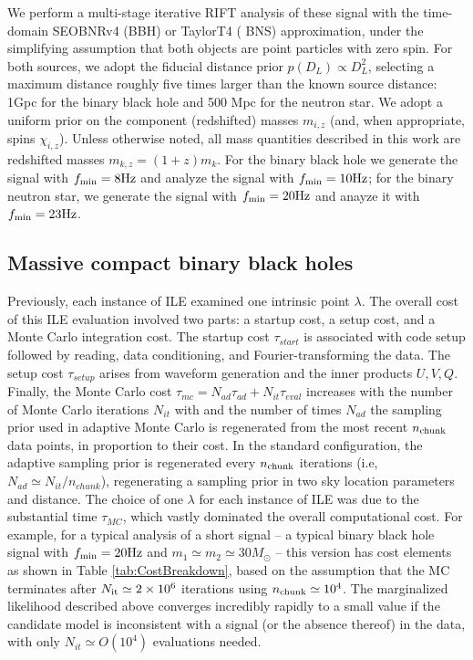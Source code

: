 \documentclass[twocolumn,prd,nofootinbib]{revtex4}
\newcommand\unit[1]{{\rm #1}}
\begin{document}
 We perform a multi-stage iterative RIFT analysis of these signal with the
time-domain SEOBNRv4 (BBH) or TaylorT4 \cite{gw-astro-PN-Comparison-AlessandraSathya2009}( BNS) approximation, under the simplifying assumption that both objects are point particles with zero
spin.   For both sources, we adopt the fiducial distance prior $p(D_L) \propto D_L^2$,   selecting  a maximum distance
roughly five times larger than the known source distance: 1Gpc for the binary black hole and 500 Mpc for the neutron
star.  We adopt a uniform prior on the component (redshifted) masses $m_{i,z}$ (and, when appropriate, spins
$\chi_{i,z}$).
Unless otherwise noted, all mass quantities described in this work are redshifted masses $m_{k,z}=(1+z)m_k$.
For the binary black hole we generate the signal with $f_{\rm min}=8 \unit{Hz}$ and analyze the signal with  $f_{\rm
  min}=10 \unit{Hz}$; for the binary neutron star, we generate the signal with $f_{\rm min}=20\unit{Hz}$ and anayze it
with $f_{\rm min}=23\unit{Hz}$.

\subsection{Massive compact binary black holes}
Previously, each instance of ILE examined one intrinsic point $\lambda$.  The overall cost of this ILE evaluation
involved two parts: a startup cost, a setup cost, and a Monte Carlo integration cost.  The  startup cost $\tau_{start}$
is associated with code setup followed by reading, data conditioning, and Fourier-transforming the
data.  The setup cost $\tau_{setup}$ arises from waveform generation and  the inner products $U,V,Q$.  Finally, the Monte Carlo
cost $\tau_{mc}=N_{ad} \tau_{ad}+N_{it}\tau_{eval}$ increases with the number of Monte Carlo iterations $N_{it}$ with
and the number of times $N_{ad}$ the sampling prior used in adaptive Monte Carlo is regenerated from the most recent 
$n_{\rm chunk}$ data points, in proportion to their
cost.   In the standard configuration, the adaptive sampling prior is regenerated every $n_{\rm chunk}$ iterations (i.e,
 $N_{ad} \simeq N_{it}/n_{chunk}$), regenerating a sampling prior in two sky location parameters and distance.  
The choice of one $\lambda$ for each instance of ILE was due to the substantial time  $\tau_{MC}$, which vastly
dominated the overall computational cost.   For example, for a typical analysis of a short signal --  a typical binary
black hole signal with $f_{\rm min}=20 \unit{Hz}$ and $m_1\simeq m_2\simeq 30 M_\odot$ --  this version has
cost elements as shown in Table \ref{tab:CostBreakdown}, based on the assumption that the MC terminates after $N_{\rm it}\simeq 2\times 10^6$ iterations using
$n_{\rm chunk}\simeq 10^4$.  
The marginalized likelihood described above  converges incredibly rapidly to a small value if the candidate model is
inconsistent with a signal (or the absence thereof) in the data, with only $N_{it} \simeq O(10^4)$  evaluations needed.
\end{document}
